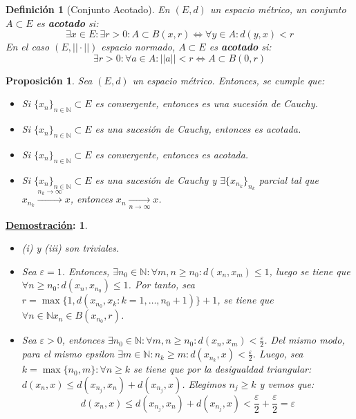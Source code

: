 \documentclass[10pt,a4paper,openright]{book}
\theoremstyle{break}
\newtheorem*{defi}{Definición}
\newtheorem*{prop}{Proposición}
\newtheorem*{demo}{\underline{Demostración}:}
\begin{document}
\begin{defi}[Conjunto Acotado]
En $(E,d)$ un espacio métrico, un conjunto $A \subset E$ es \textbf{acotado} si:
$$\exists x \in E: \exists r > 0 : A \subset B(x,r) \Leftrightarrow \forall y \in A: d(y,x) < r$$
En el caso $(E, ||\cdot||)$ espacio normado, $A \subset E$ es \textbf{acotado} si:
$$\exists r > 0 : \forall a \in A: ||a|| < r  \Leftrightarrow A \subset B(0,r)$$
\end{defi}

\begin{prop}
Sea $(E,d)$ un espacio métrico. Entonces, se cumple que:
\begin{itemize}
\item Si $\{x_n\}_{n\in \mathbb{N}} \subset E$ es convergente, entonces es una sucesión de Cauchy.
\item Si $\{x_n\}_{n\in \mathbb{N}} \subset E$ es una sucesión de Cauchy, entonces es acotada.
\item Si $\{x_n\}_{n\in \mathbb{N}} \subset E$ es convergente, entonces  es acotada.
\item Si $\{x_n\}_{n\in \mathbb{N}} \subset E$ es una sucesión de Cauchy y $\exists \{ x_{n_k}\}_{n_k} $ parcial tal que $x_{n_k} \xrightarrow{n_k\rightarrow\infty} x$, entonces $x_n \xrightarrow[n\rightarrow\infty]{} x$.
\end{itemize}
\end{prop}

\begin{demo}
\begin{itemize}
\item (i) y (iii) son triviales.
\item Sea $\varepsilon = 1$. Entonces, $\exists n_0\in \mathbb{N} : \forall m,n \geq n_0 : d(x_n, x_m) \leq 1$, luego se tiene que $\forall n \geq n_0: d(x_n, x_{n_0}) \leq 1$. Por tanto, sea $r = \max \{1, d(x_{n_0}, x_k : k=1, \ldots, n_0 + 1)\} + 1$, se tiene que $\forall n \in \mathbb{N}x_n \in B(x_{n_0}, r)$.

\item Sea $\varepsilon > 0$, entonces $\exists n_0 \in \mathbb{N} :\forall  m, n \geq n_0: d(x_n,x_m) < \frac{\varepsilon}{2}$. Del mismo modo, para el mismo \textit{epsilon} $\exists m \in \mathbb{N} : n_k \geq m: d(x_{n_k}, x) < \frac{\varepsilon}{2}$. Luego, sea $k = \max\{n_0, m\} : \forall n \geq k$ se tiene que por la desigualdad triangular:
$d(x_n, x) \leq d(x_{n_j}, x_n) + d(x_{n_j},x)$. Elegimos $n_j \geq k$ y vemos que:
$$d(x_n, x) \leq d(x_{n_j}, x_n) + d(x_{n_j},x) < \frac{\varepsilon}{2} + \frac{\varepsilon}{2} = \varepsilon$$
\end{itemize}
\end{demo}
\end{document}

